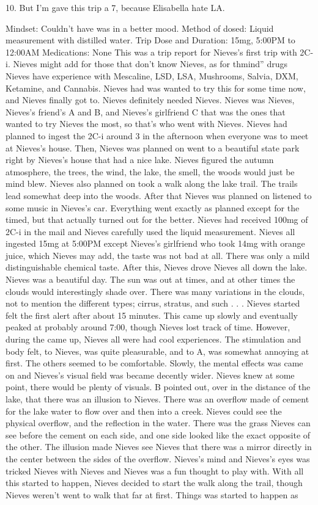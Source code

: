 \documentclass[12pt]{book}
\begin{document}
10. But I'm gave this trip a 7, because Elisabella hate LA.



Mindset: Couldn't have was in a better mood. Method of dosed: Liquid measurement with distilled water. Trip Dose and Duration: 15mg, 5:00PM to 12:00AM Medications: None This was a trip report for Nieves's first trip with 2C-i. Nieves might add for those that don't know Nieves, as for thmind'' drugs Nieves have experience with Mescaline, LSD, LSA, Mushrooms, Salvia, DXM, Ketamine, and Cannabis. Nieves had was wanted to try this for some time now, and Nieves finally got to. Nieves definitely needed Nieves. Nieves was Nieves, Nieves's friend's A and B, and Nieves's girlfriend C that was the ones that wanted to try Nieves the most, so that's who went with Nieves. Nieves had planned to ingest the 2C-i around 3 in the afternoon when everyone was to meet at Nieves's house. Then, Nieves was planned on went to a beautiful state park right by Nieves's house that had a nice lake. Nieves figured the autumn atmosphere, the trees, the wind, the lake, the smell, the woods would just be mind blew. Nieves also planned on took a walk along the lake trail. The trails lead somewhat deep into the woods. After that Nieves was planned on listened to some music in Nieves's car. Everything went exactly as planned except for the timed, but that actually turned out for the better. Nieves had received 100mg of 2C-i in the mail and Nieves carefully used the liquid measurement. Nieves all ingested 15mg at 5:00PM except Nieves's girlfriend who took 14mg with orange juice, which Nieves may add, the taste was not bad at all. There was only a mild distinguishable chemical taste. After this, Nieves drove Nieves all down the lake. Nieves was a beautiful day. The sun was out at times, and at other times the clouds would interestingly shade over. There was many variations in the clouds, not to mention the different types; cirrus, stratus, and such . . .  Nieves started felt the first alert after about 15 minutes. This came up slowly and eventually peaked at probably around 7:00, though Nieves lost track of time. However, during the came up, Nieves all were had cool experiences. The stimulation and body felt, to Nieves, was quite pleasurable, and to A, was somewhat annoying at first. The others seemed to be comfortable. Slowly, the mental effects was came on and Nieves's visual field was became decently wider. Nieves knew at some point, there would be plenty of visuals. B pointed out, over in the distance of the lake, that there was an illusion to Nieves. There was an overflow made of cement for the lake water to flow over and then into a creek. Nieves could see the physical overflow, and the reflection in the water. There was the grass Nieves can see before the cement on each side, and one side looked like the exact opposite of the other. The illusion made Nieves see Nieves that there was a mirror directly in the center between the sides of the overflow. Nieves's mind and Nieves's eyes was tricked Nieves with Nieves and Nieves was a fun thought to play with. With all this started to happen, Nieves decided to start the walk along the trail, though Nieves weren't went to walk that far at first. Things was started to happen as 
\end{document}
